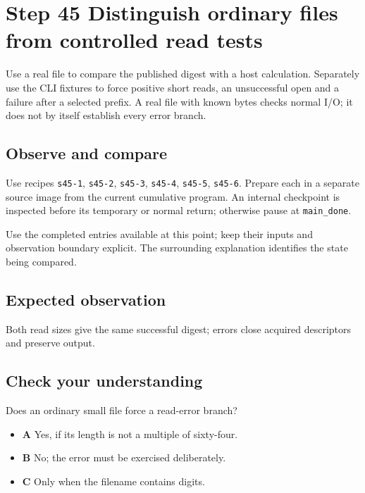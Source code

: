 \section{Step 45 Distinguish ordinary files from controlled read tests}\label{sha-s45}

Use a real file to compare the published digest with a host calculation. Separately use the CLI fixtures to force positive short reads, an unsuccessful open and a failure after a selected prefix. A real file with known bytes checks normal I/O; it does not by itself establish every error branch.

\subsection{Observe and compare}
Use recipes \texttt{s45-1}, \texttt{s45-2}, \texttt{s45-3}, \texttt{s45-4}, \texttt{s45-5}, \texttt{s45-6}. Prepare each in a separate source image from the current cumulative program. An internal checkpoint is inspected before its temporary or normal return; otherwise pause at \texttt{main\_done}.

Use the completed entries available at this point; keep their inputs and observation boundary explicit. The surrounding explanation identifies the state being compared.

\subsection{Expected observation}
Both read sizes give the same successful digest; errors close acquired descriptors and preserve output.

\subsection{Check your understanding}
Does an ordinary small file force a read-error branch?

\begin{itemize}
  \item \textbf{A} Yes, if its length is not a multiple of sixty-four.
  \item \textbf{B} No; the error must be exercised deliberately.
  \item \textbf{C} Only when the filename contains digits.
\end{itemize}
